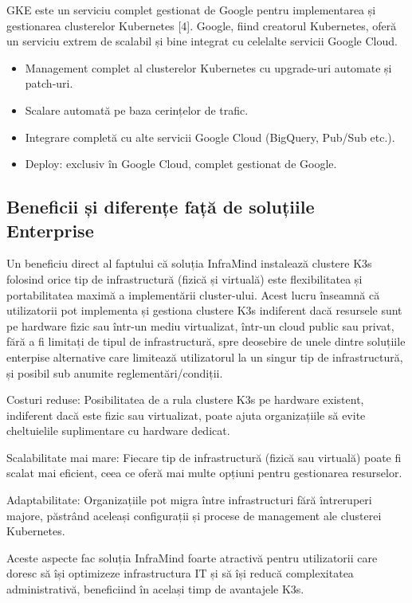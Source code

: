 \documentclass[12pt,a4paper]{report}
\begin{document}
GKE este un serviciu complet gestionat de Google pentru implementarea și gestionarea clusterelor Kubernetes [4]. Google, fiind creatorul Kubernetes, oferă un serviciu extrem de scalabil și bine integrat cu celelalte servicii Google Cloud.

\begin{itemize}
  \item Management complet al clusterelor Kubernetes cu upgrade-uri automate și patch-uri.
  \item Scalare automată pe baza cerințelor de trafic.
  \item Integrare completă cu alte servicii Google Cloud (BigQuery, Pub/Sub etc.).
  \item Deploy: exclusiv în Google Cloud, complet gestionat de Google.
\end{itemize}
\subsection{Beneficii și diferențe față de soluțiile Enterprise}

Un beneficiu direct al faptului că soluția InfraMind instalează clustere K3s folosind orice tip de infrastructură (fizică și virtuală) este flexibilitatea și portabilitatea maximă a implementării cluster-ului. Acest lucru înseamnă că utilizatorii pot implementa și gestiona clustere K3s indiferent dacă resursele sunt pe hardware fizic sau într-un mediu virtualizat, într-un cloud public sau privat, fără a fi limitați de tipul de infrastructură, spre deosebire de unele dintre soluțiile enterpise alternative care limitează utilizatorul la un singur tip de infrastructură, și posibil sub anumite reglementări/condiții.

Costuri reduse: Posibilitatea de a rula clustere K3s pe hardware existent, indiferent dacă este fizic sau virtualizat, poate ajuta organizațiile să evite cheltuielile suplimentare cu hardware dedicat.

Scalabilitate mai mare: Fiecare tip de infrastructură (fizică sau virtuală) poate fi scalat mai eficient, ceea ce oferă mai multe opțiuni pentru gestionarea resurselor.

Adaptabilitate: Organizațiile pot migra între infrastructuri fără întreruperi majore, păstrând aceleași configurații și procese de management ale clusterei Kubernetes.

Aceste aspecte fac soluția InfraMind foarte atractivă pentru utilizatorii care doresc să își optimizeze infrastructura IT și să își reducă complexitatea administrativă, beneficiind în același timp de avantajele K3s.
\end{document}
